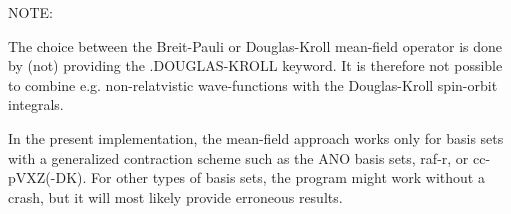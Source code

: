 \begin{description}
NOTE:  

The choice between the Breit-Pauli or Douglas-Kroll mean-field operator 
is done by (not) providing the .DOUGLAS-KROLL keyword. It is therefore 
not possible to combine e.g. non-relatvistic wave-functions with the 
Douglas-Kroll spin-orbit integrals. 


In the present implementation, the mean-field approach works only for basis sets 
with a generalized contraction scheme such as the ANO basis sets, raf-r, or cc-pVXZ(-DK).
For other types of basis sets, the program might work without a crash, but it
will most likely provide erroneous results.  



\end{description}



